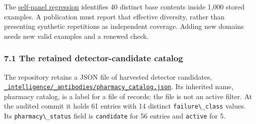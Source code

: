 \documentclass[
  11pt,
]{article}
\newcommand{\passthrough}[1]{#1}
\begin{document}
The
\href{https://github.com/dbccpage/the_symbol_game/blob/52cb5457f6c485ba548cfd292f6012a941ed22cf/symbol_game/tests/test_immune_defect_regressions.py}{self-panel
regression} identifies 40 distinct base contents inside 1,000 stored
examples. A publication must report that effective diversity, rather
than presenting synthetic repetitions as independent coverage. Adding
new domains needs new valid examples and a renewed check.

\subsubsection{7.1 The retained detector-candidate
catalog}\label{the-retained-detector-candidate-catalog}

The repository retains a JSON file of harvested detector candidates,
\href{https://github.com/dbccpage/the_symbol_game/blob/52cb5457f6c485ba548cfd292f6012a941ed22cf/_intelligence/_antibodies/pharmacy_catalog.json}{\nolinkurl{_intelligence/_antibodies/pharmacy_catalog.json}}.
Its inherited name, pharmacy catalog, is a label for a file of records;
the file is not an active filter. At the audited commit it holds 61
entries with 14 distinct \passthrough{\lstinline!failure\_class!}
values. Its \passthrough{\lstinline!pharmacy\_status!} field is
\passthrough{\lstinline!candidate!} for 56 entries and
\passthrough{\lstinline!active!} for 5.
\end{document}
